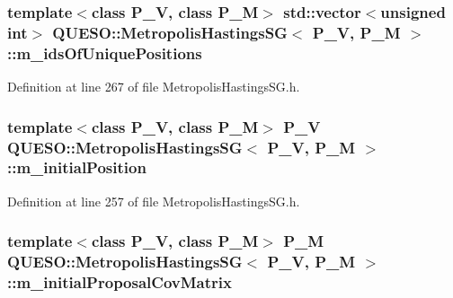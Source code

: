 \hypertarget{class_q_u_e_s_o_1_1_metropolis_hastings_s_g_ad1916a22b4a53ba67fa87f93c6e0a252}{
\subsubsection[{m\-\_\-ids\-Of\-Unique\-Positions}]{\setlength{\rightskip}{0pt plus 5cm}template$<$class P\-\_\-\-V, class P\-\_\-\-M$>$ std\-::vector$<$unsigned int$>$ {\bf Q\-U\-E\-S\-O\-::\-Metropolis\-Hastings\-S\-G}$<$ P\-\_\-\-V, P\-\_\-\-M $>$\-::m\-\_\-ids\-Of\-Unique\-Positions\hspace{0.3cm}{\ttfamily [private]}}}\label{class_q_u_e_s_o_1_1_metropolis_hastings_s_g_ad1916a22b4a53ba67fa87f93c6e0a252}


Definition at line 267 of file Metropolis\-Hastings\-S\-G.\-h.

\hypertarget{class_q_u_e_s_o_1_1_metropolis_hastings_s_g_ae29f5d1198228858283d733021da2b14}{
\subsubsection[{m\-\_\-initial\-Position}]{\setlength{\rightskip}{0pt plus 5cm}template$<$class P\-\_\-\-V, class P\-\_\-\-M$>$ P\-\_\-\-V {\bf Q\-U\-E\-S\-O\-::\-Metropolis\-Hastings\-S\-G}$<$ P\-\_\-\-V, P\-\_\-\-M $>$\-::m\-\_\-initial\-Position\hspace{0.3cm}{\ttfamily [private]}}}\label{class_q_u_e_s_o_1_1_metropolis_hastings_s_g_ae29f5d1198228858283d733021da2b14}


Definition at line 257 of file Metropolis\-Hastings\-S\-G.\-h.

\hypertarget{class_q_u_e_s_o_1_1_metropolis_hastings_s_g_a4d9862afbafb34921e91de3d4610c6cd}{
\subsubsection[{m\-\_\-initial\-Proposal\-Cov\-Matrix}]{\setlength{\rightskip}{0pt plus 5cm}template$<$class P\-\_\-\-V, class P\-\_\-\-M$>$ P\-\_\-\-M {\bf Q\-U\-E\-S\-O\-::\-Metropolis\-Hastings\-S\-G}$<$ P\-\_\-\-V, P\-\_\-\-M $>$\-::m\-\_\-initial\-Proposal\-Cov\-Matrix\hspace{0.3cm}{\ttfamily [private]}}}\label{class_q_u_e_s_o_1_1_metropolis_hastings_s_g_a4d9862afbafb34921e91de3d4610c6cd}


